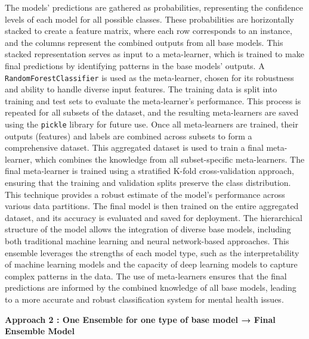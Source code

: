 \noindent
The models' predictions are gathered as probabilities, representing the confidence levels of each model for all possible classes. These probabilities are horizontally stacked to create a feature matrix, where each row corresponds to an instance, and the columns represent the combined outputs from all base models. This stacked representation serves as input to a meta-learner, which is trained to make final predictions by identifying patterns in the base models' outputs. A \texttt{RandomForestClassifier} is used as the meta-learner, chosen for its robustness and ability to handle diverse input features. The training data is split into training and test sets to evaluate the meta-learner's performance. This process is repeated for all subsets of the dataset, and the resulting meta-learners are saved using the \texttt{pickle} library for future use. Once all meta-learners are trained, their outputs (features) and labels are combined across subsets to form a comprehensive dataset. This aggregated dataset is used to train a final meta-learner, which combines the knowledge from all subset-specific meta-learners. The final meta-learner is trained using a stratified K-fold cross-validation approach, ensuring that the training and validation splits preserve the class distribution. This technique provides a robust estimate of the model's performance across various data partitions. The final model is then trained on the entire aggregated dataset, and its accuracy is evaluated and saved for deployment. The hierarchical structure of the model allows the integration of diverse base models, including both traditional machine learning and neural network-based approaches. This ensemble leverages the strengths of each model type, such as the interpretability of machine learning models and the capacity of deep learning models to capture complex patterns in the data. The use of meta-learners ensures that the final predictions are informed by the combined knowledge of all base models, leading to a more accurate and robust classification system for mental health issues.

\vspace{2em}

\noindent
\textbf{Approach 2 : One Ensemble for one type of base model → Final Ensemble Model}

